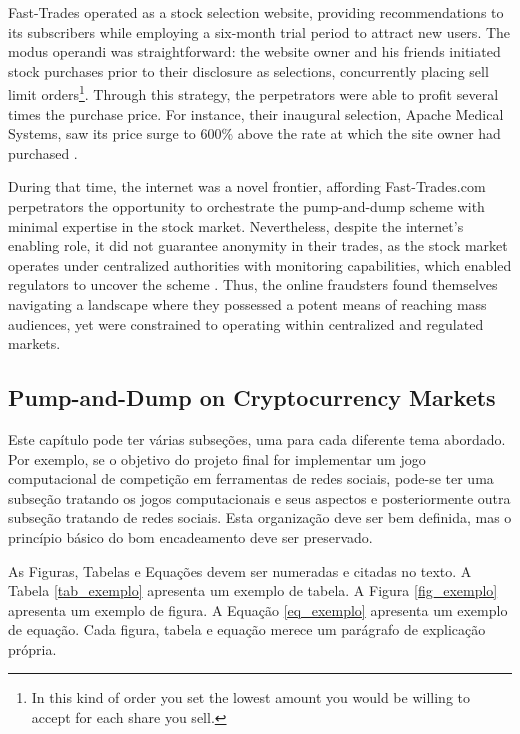 \documentclass[12pt]{article}
\begin{document}
	Fast-Trades operated as a stock selection website, providing recommendations to its subscribers while employing a six-month trial period to attract new users.
	The modus operandi was straightforward: the website owner and his friends initiated stock purchases prior to their disclosure as selections, concurrently placing sell limit orders\footnote{In this kind of order you set the lowest amount you would be willing to accept for each share you sell.}.
	Through this strategy, the perpetrators were able to profit several times the purchase price.
	For instance, their inaugural selection, Apache Medical Systems, saw its price surge to 600\% above the rate at which the site owner had purchased \citep{kramer2005}.

	During that time, the internet was a novel frontier, affording Fast-Trades.com perpetrators the opportunity to orchestrate the pump-and-dump scheme with minimal expertise in the stock market.
	Nevertheless, despite the internet's enabling role, it did not guarantee anonymity in their trades, as the stock market operates under centralized authorities with monitoring capabilities, which enabled regulators to uncover the scheme \citep{kramer2005}.
	Thus, the online fraudsters found themselves navigating a landscape where they possessed a potent means of reaching mass audiences, yet were constrained to operating within centralized and regulated markets.
	
	\subsection{Pump-and-Dump on Cryptocurrency Markets}
	\label{subsec_pump_in_crypto}

	Este capítulo pode ter várias subseções, uma para cada diferente tema abordado. Por exemplo, se o objetivo do projeto final for implementar um jogo computacional de competição em ferramentas de redes sociais, pode-se ter uma subseção tratando os jogos computacionais e seus aspectos e posteriormente outra subseção tratando de redes sociais. Esta organização deve ser bem definida, mas o princípio básico do bom encadeamento deve ser preservado.
	
	
	As Figuras, Tabelas e Equações devem ser numeradas e citadas no texto. A Tabela \ref{tab_exemplo} apresenta um exemplo de tabela. A Figura \ref{fig_exemplo} apresenta um exemplo de figura. A Equação \ref{eq_exemplo} apresenta um exemplo de equação. Cada figura, tabela e equação merece um parágrafo de explicação própria.
	
\end{document}
